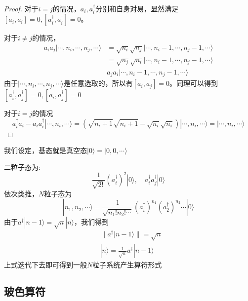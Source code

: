\documentclass[12pt]{article}
\newtheorem{proof}{证明}[subsection]
\begin{document}
\begin{proof}
    对于$i=j$的情况，$a_i,a_i^\dagger$分别和自身对易，显然满足$[a_i,a_i]=0,[a_i^\dagger,a_i^\dagger]=0$。

    对于$i\neq j$的情况，
    \begin{equation*}
        \begin{split}
            a_ia_j|\cdots,n_i,\cdots,n_j,\cdots\rangle&=\sqrt{n_i}\sqrt{n_j}|\cdots,n_i-1,\cdots,n_j-1,\cdots\rangle\\
            &=\sqrt{n_j}\sqrt{n_i}|\cdots,n_i-1,\cdots,n_j-1,\cdots\rangle\\
            &a_j a_i|\cdots,n_i-1,\cdots,n_j-1,\cdots\rangle
        \end{split}
    \end{equation*}
    由于$|\cdots,n_i,\cdots,n_j,\cdots\rangle$是任意选取的，所以有$[a_i,a_j]=0$。同理可以得到$[a_i^\dagger,a_j^\dagger]=0,[a_i,a_j^\dagger]=0$

    对于$i=j$的情况
    \begin{equation*}
        a_i^\dagger a_i-a_ia_i^\dagger|\cdots,n_i,\cdots\rangle=(\sqrt{n_i+1}\sqrt{n_i+1}-\sqrt{n_i}\sqrt{n_i})|\cdots,n_i,\cdots\rangle=|\cdots,n_i,\cdots\rangle
    \end{equation*}
\end{proof}
我们设定，基态就是真空态$|0\rangle=|0,0,\cdots\rangle$

二粒子态为:
\begin{equation*}
    \frac{1}{\sqrt{2!}}(a_i^\dagger)^2|0\rangle,\quad a_i^\dagger a_j^\dagger|0\rangle
\end{equation*}
依次类推，$N$粒子态为
\begin{equation*}
    |n_1,n_2,\cdots\rangle=\frac{1}{\sqrt{n_1!n_2!\cdots}}(a_i^\dagger)^{n_1}(a_2^\dagger)^{n_2}\cdots|0\rangle
\end{equation*}
由于$a^\dagger|n-1\rangle=\sqrt{n}|n\rangle$，我们得到
\begin{equation*}
    \begin{split}
        &\|a^\dagger|n-1\rangle\|=\sqrt{n}\\
        &|n\rangle=\frac{1}{\sqrt{n}}a^\dagger|n-1\rangle
    \end{split}
\end{equation*}
上式迭代下去即可得到一般$N$粒子系统产生算符形式
\subsection{玻色算符}
\end{document}
